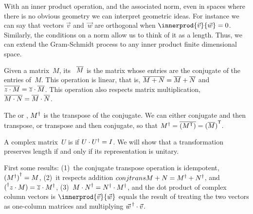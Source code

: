 With an inner product operation, and the associated norm, 
even in spaces where there is no obvious geometry we can 
interpret geometric ideas. 
For instance we can say that
vectors $\vec{v}$ and~$\vec{w}$ are orthogonal when 
$\innerprod{\vec{v}}{\vec{w}}=0$.
Similarly, the conditions on a norm allow us to think of it as a length.
Thus, we can extend the Gram-Schmidt process
to any inner product finite dimensional space.

Given a matrix~$M$, its ~$\overline{M}$ is 
the matrix whose entries are the conjugate of the entries of~$M$.
This operation is linear, that is, 
$\overline{M+N}=\overline{M}+\overline{N}$ and 
$\overline{z\cdot M}=\overline{z}\cdot\overline{M}$.
This operation also respects matrix multiplication, 
$\overline{M\cdot N}=\overline{M}\cdot\overline{N}$.  

The  or ,
${M}^{\dagger}$
is the transpose of the conjugate.
We can either conjugate and then transpose, or transpose and 
then conjugate, so that
${M}^{\dagger}=\overline{({{M}^{\mathsf{T}}})}={{(\overline{M})}^{\mathsf{T}}}$.

A complex matrix~$U$ is  if $U\cdot{U}^{\dagger}=I$.
We will show that a transformation preserves length if and only if its
representation is unitary.

First some results:
(1)~the conjugate transpose operation is idempotent, 
${({M}^{\dagger})}^{\dagger}=M$,
(2)~it respects addition $conjtrans{M+N}={M}^{\dagger}+{N}^{\dagger}$,
and ${(}^{\dagger}z\cdot M)=\overline{z}\cdot{M}^{\dagger}$,
(3)~${M\cdot N}^{\dagger}={N}^{\dagger}\cdot{M}^{\dagger}$,
and the dot product of complex column vectors is 
$\innerprod{\vec{v}}{\vec{w}}$ equals the 
result of treating the two vectors as one-column matrices and 
multiplying ${\vec{w}\,}^{\dagger}\cdot \vec{v}$.

